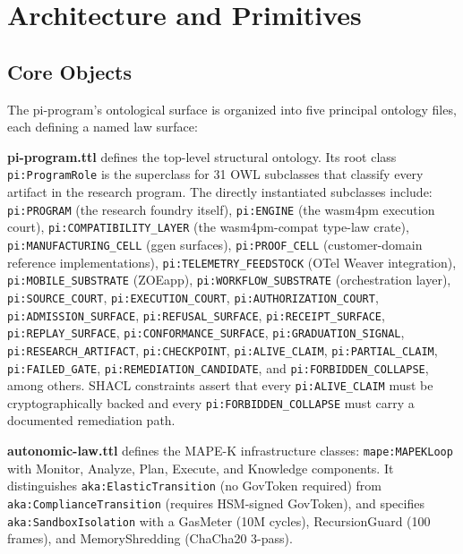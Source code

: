 
\section{Architecture and Primitives}
\label{sec:research-pi-program-arch}

\subsection{Core Objects}
\label{sec:research-pi-program-arch-objects}

The pi-program's ontological surface is organized into five principal ontology files, each defining a named law surface:

\textbf{pi-program.ttl} defines the top-level structural ontology. Its root class \texttt{pi:ProgramRole} is the superclass for 31 OWL subclasses that classify every artifact in the research program. The directly instantiated subclasses include: \texttt{pi:PROGRAM} (the research foundry itself), \texttt{pi:ENGINE} (the wasm4pm execution court), \texttt{pi:COMPATIBILITY\_LAYER} (the wasm4pm-compat type-law crate), \texttt{pi:MANUFACTURING\_CELL} (ggen surfaces), \texttt{pi:PROOF\_CELL} (customer-domain reference implementations), \texttt{pi:TELEMETRY\_FEEDSTOCK} (OTel Weaver integration), \texttt{pi:MOBILE\_SUBSTRATE} (ZOEapp), \texttt{pi:WORKFLOW\_SUBSTRATE} (orchestration layer), \texttt{pi:SOURCE\_COURT}, \texttt{pi:EXECUTION\_COURT}, \texttt{pi:AUTHORIZATION\_COURT}, \texttt{pi:ADMISSION\_SURFACE}, \texttt{pi:REFUSAL\_SURFACE}, \texttt{pi:RECEIPT\_SURFACE}, \texttt{pi:REPLAY\_SURFACE}, \texttt{pi:CONFORMANCE\_SURFACE}, \texttt{pi:GRADUATION\_SIGNAL}, \texttt{pi:RESEARCH\_ARTIFACT}, \texttt{pi:CHECKPOINT}, \texttt{pi:ALIVE\_CLAIM}, \texttt{pi:PARTIAL\_CLAIM}, \texttt{pi:FAILED\_GATE}, \texttt{pi:REMEDIATION\_CANDIDATE}, and \texttt{pi:FORBIDDEN\_COLLAPSE}, among others. SHACL constraints assert that every \texttt{pi:ALIVE\_CLAIM} must be cryptographically backed and every \texttt{pi:FORBIDDEN\_COLLAPSE} must carry a documented remediation path.

\textbf{autonomic-law.ttl} defines the MAPE-K infrastructure classes: \texttt{mape:MAPEKLoop} with Monitor, Analyze, Plan, Execute, and Knowledge components. It distinguishes \texttt{aka:ElasticTransition} (no GovToken required) from \texttt{aka:ComplianceTransition} (requires HSM-signed GovToken), and specifies \texttt{aka:SandboxIsolation} with a GasMeter (10M cycles), RecursionGuard (100 frames), and MemoryShredding (ChaCha20 3-pass).

